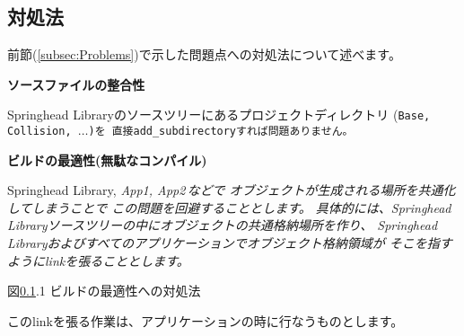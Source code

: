 \newpage
\subsection{対処法}
\label{subsec:Solution}

\noindent
前節(\ref{subsec:Problems})で示した問題点への対処法について述べます。

\bigskip
\noindent
\bf{ソースファイルの整合性}
\begin{narrow}[20pt]
	Springhead Libraryのソースツリーにあるプロジェクトディレクトリ
	(\tt{Base}, \tt{Collision}, $\ldots$)を
	直接\tt{add\_subdirectory}すれば問題ありません。
\end{narrow}

\medskip
\noindent
\bf{ビルドの最適性(無駄なコンパイル)}
\begin{narrow}[20pt]
	Springhead Library, \it{App1, App2\,}などで
	オブジェクトが生成される場所を共通化してしまうことで
	この問題を回避することとします。
	具体的には、Springhead Libraryソースツリーの中にオブジェクトの共通格納場所を作り、
	Springhead Libraryおよびすべてのアプリケーションでオブジェクト格納領域が
	そこを指すようにlinkを張ることとします。

	\medskip
    	\begin{narrow}\begin{minipage}{\textwidth}
		\medskip
    	\end{minipage}\end{narrow}
    	\begin{narrow}\begin{minipage}{\textwidth}
		\medskip
  	\end{minipage}\end{narrow}
	\begin{center}図\ref{subsec:Solution}.1 ビルドの最適性への対処法\end{center}
	このlinkを張る作業は、アプリケーションの\cmake 時に行なうものとします。
\end{narrow}

